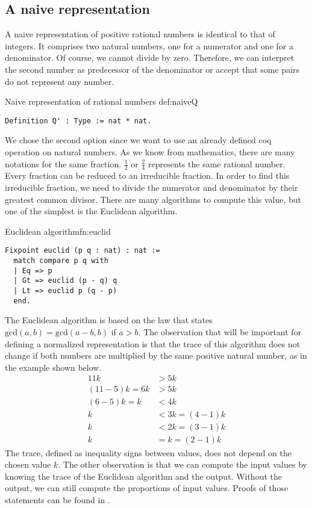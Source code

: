 \subsection{A naive representation}
A naive representation of positive rational numbers is identical to that of integers. It comprises two natural numbers, one for a numerator and one for a denominator. Of course, we cannot divide by zero. Therefore, we can interpret the second number as predecessor of the denominator or accept that some pairs do not represent any number.
\begin{defi}{Naive representation of rational numbers }{def:naiveQ}
\begin{verbatim}
Definition Q' : Type := nat * nat.
\end{verbatim}
\end{defi}
We chose the second option since we want to use an already defined coq operation on natural numbers. As we know from mathematics, there are many notations for the same fraction. $\frac{1}{2}$ or $\frac{2}{4}$ represents the same rational number. Every fraction can be reduced to an irreducible fraction. In order to find this irreducible fraction, we need to divide the numerator and denominator by their greatest common divisor. There are many algorithms to compute this value, but one of the simplest is the Euclidean algorithm.
\begin{func}{Euclidean algorithm}{fn:euclid}
\begin{verbatim}
Fixpoint euclid (p q : nat) : nat :=
  match compare p q with
  | Eq => p
  | Gt => euclid (p - q) q
  | Lt => euclid p (q - p)
  end.
\end{verbatim}
\end{func}
The Euclidean algorithm is based on the law that states $\textrm{gcd}(a, b) = \textrm{gcd}(a - b, b)$ if $a > b$. The observation that will be important for defining a normalized representation is that the trace of this algorithm does not change if both numbers are multiplied by the same positive natural number, as in the example shown below.
\begin{equation}
    \begin{split}
        11k&>5k\\
        (11-5)k=6k&>5k\\
        (6-5)k=k&<4k\\
        k&<3k=(4-1)k\\
        k&<2k=(3-1)k\\
        k&=k=(2-1)k
    \end{split}
\end{equation}
The trace,  defined as inequality signs between values, does not depend on the chosen value $k$. The other observation is that we can compute the input values by knowing the trace of the Euclidean algorithm and the output. Without the output, we can still compute the proportions of input values. Proofs of those statements can be found in .

